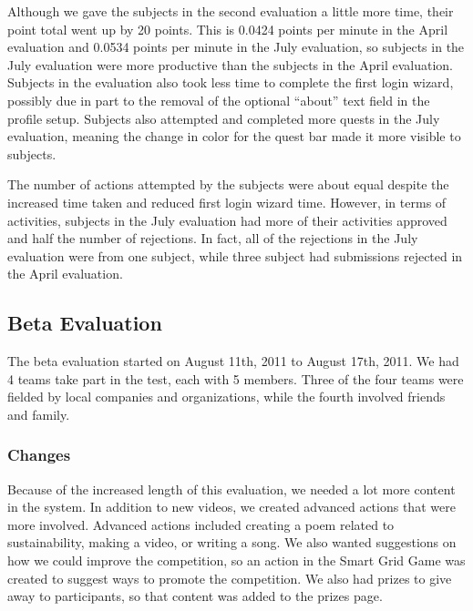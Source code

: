 Although we gave the subjects in the second evaluation a little more time, their point total went up by 20 points. This is 0.0424 points per minute in the April evaluation and 0.0534 points per minute in the July evaluation, so subjects in the July evaluation were more productive than the subjects in the April evaluation. Subjects in the evaluation also took less time to complete the first login wizard, possibly due in part to the removal of the optional ``about'' text field in the profile setup. Subjects also attempted and completed more quests in the July evaluation, meaning the change in color for the quest bar made it more visible to subjects.

The number of actions attempted by the subjects were about equal despite the increased time taken and reduced first login wizard time. However, in terms of activities, subjects in the July evaluation had more of their activities approved and half the number of rejections. In fact, all of the rejections in the July evaluation were from one subject, while three subject had submissions rejected in the April evaluation.

% 

\subsection{Beta Evaluation}

The beta evaluation started on August 11th, 2011 to August 17th, 2011. We had 4 teams take part in the test, each with 5 members. Three of the four teams were fielded by local companies and organizations, while the fourth involved friends and family.

\subsubsection{Changes}

Because of the increased length of this evaluation, we needed a lot more content in the system. In addition to new videos, we created advanced actions that were more involved. Advanced actions included creating a poem related to sustainability, making a video, or writing a song. We also wanted suggestions on how we could improve the competition, so an action in the Smart Grid Game was created to suggest ways to promote the competition. We also had prizes to give away to participants, so that content was added to the prizes page.

